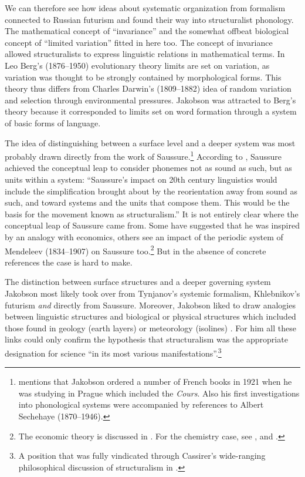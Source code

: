 \documentclass[output=paper]{langscibook}
\begin{document}
We can therefore see how ideas about systematic organization from formalism connected to Russian futurism and found their way into structuralist phonology. The mathematical concept of ``invariance'' and the somewhat offbeat biological concept of ``limited variation'' fitted in here too. The concept of invariance allowed structuralists to express linguistic relations in mathematical terms. In Leo Berg's (1876--1950) evolutionary theory limits are set on variation, as variation was thought to be strongly contained by morphological forms. This theory thus differs from Charles Darwin's (1809--1882) idea of random variation and selection through environmental pressures. Jakobson was attracted to Berg's theory because it corresponded to limits set on word formation through a system of basic forms of language.

The idea of distinguishing between a surface level and a deeper system was most probably drawn directly from the work of Saussure.\footnote{\citet[88--94]{Toman1995} mentions that Jakobson ordered a number of French books in 1921 when he was studying in Prague which included the \emph{Cours}. Also his first investigations into phonological systems were accompanied by references to Albert Sechehaye (1870--1946).} According to \citet[237]{Joseph2010}, Saussure achieved the conceptual leap to consider phonemes not as sound as such, but as units within a system: ``Saussure's impact on 20th century linguistics would include the simplification brought about by the reorientation away from sound as such, and toward systems and the units that compose them. This would be the basis for the movement known as structuralism.” It is not entirely clear where the conceptual leap of Saussure came from. Some have suggested that he was inspired by an analogy with economics, others see an impact of the periodic system of Mendeleev (1834--1907) on Saussure too.\footnote{The economic theory is discussed in \citet{Joseph2014}. For the chemistry case, see \citet{Culler1976}, \citet{Clark2008} and \citet{Silverstein2016}.} But in the absence of concrete references the case is hard to make. 


The distinction between surface structures and a deeper governing system Ja\-kob\-son most likely took over from Tynjanov's systemic formalism, Khleb\-ni\-kov's futurism \emph{and} directly from Saussure.
Moreover, Jakobson liked to draw analogies between linguistic structures and biological or physical structures which included those found in geology (earth layers) or meteorology (isolines) \citep[see][74--74, 188--194]{Holenstein1975}. For him all these links could only confirm the hypothesis that structuralism was the appropriate designation for science ``in its most various manifestations''.\footnote{A position that was fully vindicated through Cassirer's wide-ranging philosophical discussion of structuralism in \citet{Cassirer1945}.}  
\end{document}
